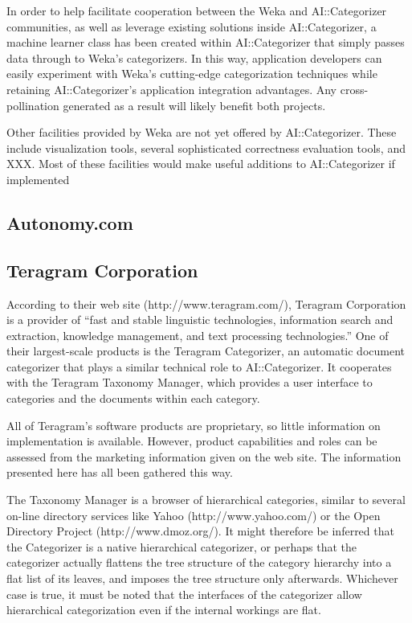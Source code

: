 \documentclass[a4paper]{report}
\begin{document}
In order to help facilitate cooperation between the Weka and
AI::Categorizer communities, as well as leverage existing solutions
inside AI::Categorizer, a machine learner class has been created
within AI::Categorizer that simply passes data through to Weka's
categorizers.  In this way, application developers can easily
experiment with Weka's cutting-edge categorization techniques while
retaining AI::Categorizer's application integration advantages.  Any
cross-pollination generated as a result will likely benefit both
projects.

Other facilities provided by Weka are not yet offered by
AI::Categorizer.  These include visualization tools, several
sophisticated correctness evaluation tools, and XXX.  Most of these
facilities would make useful additions to AI::Categorizer if
implemented

\subsection{Autonomy.com}

\subsection{Teragram Corporation}

According to their web site (http://www.teragram.com/), Teragram
Corporation is a provider of ``fast and stable linguistic
technologies, information search and extraction, knowledge management,
and text processing technologies.''  One of their largest-scale
products is the Teragram Categorizer, an automatic document
categorizer that plays a similar technical role to AI::Categorizer.
It cooperates with the Teragram Taxonomy Manager, which provides a
user interface to categories and the documents within each category.

All of Teragram's software products are proprietary, so little
information on implementation is available.  However, product
capabilities and roles can be assessed from the marketing information
given on the web site.  The information presented here has all been
gathered this way.

The Taxonomy Manager is a browser of hierarchical categories, similar
to several on-line directory services like Yahoo
(http://www.yahoo.com/) or the Open Directory Project
(http://www.dmoz.org/).  It might therefore be inferred that the
Categorizer is a native hierarchical categorizer, or perhaps that the
categorizer actually flattens the tree structure of the category
hierarchy into a flat list of its leaves, and imposes the tree
structure only afterwards.  Whichever case is true, it must be noted
that the interfaces of the categorizer allow hierarchical
categorization even if the internal workings are flat.
\end{document}

